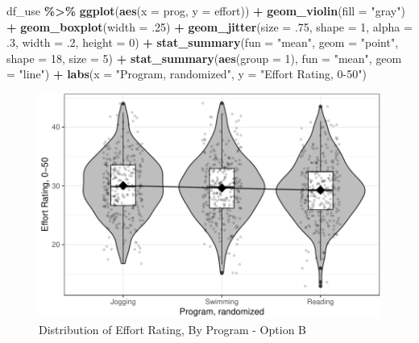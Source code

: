 \documentclass[
]{article}
\newenvironment{Shaded}{\begin{snugshade}}{\end{snugshade}}
\newcommand{\AttributeTok}[1]{\textcolor[rgb]{0.13,0.29,0.53}{#1}}
\newcommand{\DecValTok}[1]{\textcolor[rgb]{0.00,0.00,0.81}{#1}}
\newcommand{\FunctionTok}[1]{\textcolor[rgb]{0.13,0.29,0.53}{\textbf{#1}}}
\newcommand{\NormalTok}[1]{#1}
\newcommand{\SpecialCharTok}[1]{\textcolor[rgb]{0.81,0.36,0.00}{\textbf{#1}}}
\newcommand{\StringTok}[1]{\textcolor[rgb]{0.31,0.60,0.02}{#1}}
\begin{document}
\begin{Shaded}
\begin{Highlighting}[]
\NormalTok{df\_use }\SpecialCharTok{\%\textgreater{}\%} 
  \FunctionTok{ggplot}\NormalTok{(}\FunctionTok{aes}\NormalTok{(}\AttributeTok{x =}\NormalTok{ prog,}
             \AttributeTok{y =}\NormalTok{ effort)) }\SpecialCharTok{+} 
  \FunctionTok{geom\_violin}\NormalTok{(}\AttributeTok{fill =} \StringTok{"gray"}\NormalTok{) }\SpecialCharTok{+}
  \FunctionTok{geom\_boxplot}\NormalTok{(}\AttributeTok{width =}\NormalTok{ .}\DecValTok{25}\NormalTok{) }\SpecialCharTok{+}
  \FunctionTok{geom\_jitter}\NormalTok{(}\AttributeTok{size =}\NormalTok{ .}\DecValTok{75}\NormalTok{,}
              \AttributeTok{shape =} \DecValTok{1}\NormalTok{,}
              \AttributeTok{alpha =}\NormalTok{ .}\DecValTok{3}\NormalTok{,}
              \AttributeTok{width =}\NormalTok{ .}\DecValTok{2}\NormalTok{,}
              \AttributeTok{height =} \DecValTok{0}\NormalTok{) }\SpecialCharTok{+}
  \FunctionTok{stat\_summary}\NormalTok{(}\AttributeTok{fun =} \StringTok{"mean"}\NormalTok{,}
               \AttributeTok{geom =} \StringTok{"point"}\NormalTok{,}
               \AttributeTok{shape =} \DecValTok{18}\NormalTok{,}
               \AttributeTok{size =} \DecValTok{5}\NormalTok{) }\SpecialCharTok{+}
  \FunctionTok{stat\_summary}\NormalTok{(}\FunctionTok{aes}\NormalTok{(}\AttributeTok{group =} \DecValTok{1}\NormalTok{),}
               \AttributeTok{fun =} \StringTok{"mean"}\NormalTok{,}
               \AttributeTok{geom =} \StringTok{"line"}\NormalTok{) }\SpecialCharTok{+}
  \FunctionTok{labs}\NormalTok{(}\AttributeTok{x =} \StringTok{"Program, randomized"}\NormalTok{,}
       \AttributeTok{y =} \StringTok{"Effort Rating, 0{-}50"}\NormalTok{) }
\end{Highlighting}
\end{Shaded}

\begin{figure}[hb]

\includegraphics{Appendix_ex_weightloss_files/figure-latex/unnamed-chunk-55-1} \hfill{}

\caption{Distribution of Effort Rating, By Program - Option B}\label{fig:unnamed-chunk-55}
\end{figure}
\end{document}
